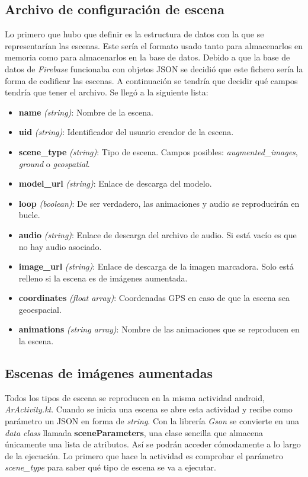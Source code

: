 
\subsection{Archivo de configuración de escena}

Lo primero que hubo que definir es la estructura de datos con la que se representarían las escenas. Este sería el formato usado tanto para almacenarlos en memoria como para almacenarlos en la base de datos. Debido a que la base de datos de \textit{Firebase} funcionaba con objetos JSON se decidió que este fichero sería la forma de codificar las escenas. A continuación se tendría que decidir qué campos tendría que tener el archivo. Se llegó a la siguiente lista:

\begin{itemize}
    \item \textbf{name} \textit{(string)}: Nombre de la escena.
    \item \textbf{uid} \textit{(string)}: Identificador del usuario creador de la escena.
    \item \textbf{scene\_type} \textit{(string)}: Tipo de escena. Campos posibles: \textit{augmented\_images}, \textit{ground} o \textit{geospatial}.
    \item \textbf{model\_url} \textit{(string)}: Enlace de descarga del modelo.
    \item \textbf{loop} \textit{(boolean)}: De ser verdadero, las animaciones y audio se reproducirán en bucle.
    \item \textbf{audio} \textit{(string)}: Enlace de descarga del archivo de audio. Si está vacío es que no hay audio asociado.
    \item \textbf{image\_url} \textit{(string)}: Enlace de descarga de la imagen marcadora. Solo está relleno si la escena es de imágenes aumentada.
    \item \textbf{coordinates} \textit{(float array)}: Coordenadas GPS en caso de que la escena sea geoespacial.
    \item \textbf{animations} \textit{(string array)}: Nombre de las animaciones que se reproducen en la escena.
\end{itemize}

\subsection{Escenas de imágenes aumentadas}

Todos los tipos de escena se reproducen en la misma actividad android, \textit{ArActivity.kt}. Cuando se inicia una escena se abre esta actividad y recibe como parámetro un JSON en forma de \textit{string}. Con la librería \textit{Gson}\cite{gson} se convierte en una \textit{data class} llamada \textbf{sceneParameters}, una clase sencilla que almacena únicamente una lista de atributos. Así se podrán acceder cómodamente a lo largo de la ejecución. Lo primero que hace la actividad es comprobar el parámetro \textit{scene\_type} para saber qué tipo de escena se va a ejecutar.


